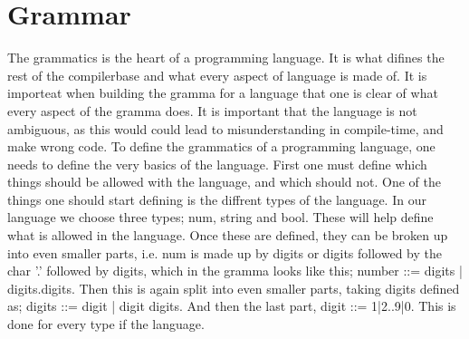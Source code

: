 \section{Grammar}
The grammatics is the heart of a programming language. It is what difines the rest of the compilerbase and what every aspect of language is made of.
It is importeat when building the gramma for a language that one is clear of what every aspect of the gramma does. It is important that the language is not ambiguous, as this would could lead to misunderstanding in compile-time, and make wrong code.
To define the grammatics of a programming language, one needs to define the very basics of the language. First one must define which things should be allowed with the language, and which should not.
One of the things one should start defining is the diffrent types of the language. In our language we choose three types; num, string and bool. These will help define what is allowed in the language. Once these are defined, they can be broken up into even smaller parts, i.e. num is made up by digits or digits followed by the char '.' followed by digits, which in the gramma looks like this; number ::= digits | digits.digits.
Then this is again split into even smaller parts, taking digits defined as; digits ::= digit | digit digits. And then the last part, digit ::= 1|2..9|0. This is done for every type if the language.